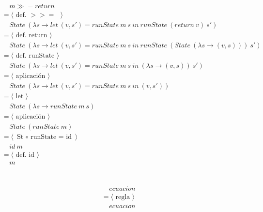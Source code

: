 \documentclass[a4paper,10pt]{article}
\begin{document}
	\\
	\begin{align*}
  	&\ \ \ \ \ m \gg= return
  	\\ &=\langle \text{ def. $>>=$ }\rangle
  	\\ &\ \ \ \ \ State\ (\lambda s \rightarrow let\ (v,s')=runState\ m\ s\ in\ runState\ (return\ v)\ s')
  	\\ &=\langle \text{ def. return }\rangle
  	\\ &\ \ \ \ \ State\ (\lambda s \rightarrow let\ (v,s')=runState\ m\ s\ in\ runState\ (State\ (\lambda s \rightarrow (v,s)))\ s')
  	\\ &=\langle \text{ def. runState }\rangle
	\\ &\ \ \ \ \ State\ (\lambda s \rightarrow let\ (v,s')=runState\ m\ s\ in\ (\lambda s \rightarrow (v,s))\ s')
  	\\ &=\langle \text{ aplicación }\rangle
	\\ &\ \ \ \ \ State\ (\lambda s \rightarrow let\ (v,s')=runState\ m\ s\ in\ (v,s'))
  	\\ &=\langle \text{ let }\rangle
	\\ &\ \ \ \ \ State\ (\lambda s \rightarrow runState\ m\ s)
  	\\ &=\langle \text{ aplicación }\rangle
  	\\ &\ \ \ \ \ State\ (runState\ m)
  	\\ &=\langle \text{ St $\circ$ runState = id }\rangle
  	\\ &\ \ \ \ \ id\ m
  	\\ &=\langle \text{ def. id }\rangle
  	\\ &\ \ \ \ \ m
  	\end{align*}
  	\pagebreak
	\\
	\\
	\begin{align*}
  	&\ \ \ \ \ ecuacion
  	\\ &=\langle \text{ regla }\rangle
  	\\ &\ \ \ \ \ ecuacion
  	\end{align*}
  	\\
\end{document}
